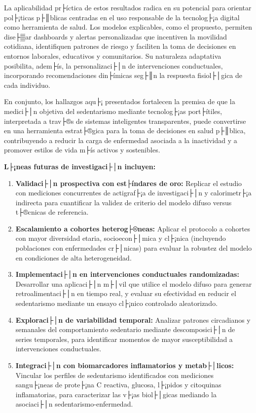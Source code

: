 La aplicabilidad pr├íctica de estos resultados radica en su potencial para orientar pol├¡ticas p├║blicas centradas en el uso responsable de la tecnolog├¡a digital como herramienta de salud. Los modelos explicables, como el propuesto, permiten dise├▒ar dashboards y alertas personalizadas que incentiven la movilidad cotidiana, identifiquen patrones de riesgo y faciliten la toma de decisiones en entornos laborales, educativos y comunitarios. Su naturaleza adaptativa posibilita, adem├ís, la personalizaci├│n de intervenciones conductuales, incorporando recomendaciones din├ímicas seg├║n la respuesta fisiol├│gica de cada individuo.

En conjunto, los hallazgos aqu├¡ presentados fortalecen la premisa de que la medici├│n objetiva del sedentarismo mediante tecnolog├¡as port├ítiles, interpretada a trav├®s de sistemas inteligentes transparentes, puede convertirse en una herramienta estrat├®gica para la toma de decisiones en salud p├║blica, contribuyendo a reducir la carga de enfermedad asociada a la inactividad y a promover estilos de vida m├ís activos y sostenibles.

\textbf{L├¡neas futuras de investigaci├│n incluyen:}

\begin{enumerate}
    \item \textbf{Validaci├│n prospectiva con est├índares de oro:} Replicar el estudio con mediciones concurrentes de actigraf├¡a de investigaci├│n y calorimetr├¡a indirecta para cuantificar la validez de criterio del modelo difuso versus t├®cnicas de referencia.
    
    \item \textbf{Escalamiento a cohortes heterog├®neas:} Aplicar el protocolo a cohortes con mayor diversidad etaria, socioecon├│mica y cl├¡nica (incluyendo poblaciones con enfermedades cr├│nicas) para evaluar la robustez del modelo en condiciones de alta heterogeneidad.
    
    \item \textbf{Implementaci├│n en intervenciones conductuales randomizadas:} Desarrollar una aplicaci├│n m├│vil que utilice el modelo difuso para generar retroalimentaci├│n en tiempo real, y evaluar su efectividad en reducir el sedentarismo mediante un ensayo cl├¡nico controlado aleatorizado.
    
    \item \textbf{Exploraci├│n de variabilidad temporal:} Analizar patrones circadianos y semanales del comportamiento sedentario mediante descomposici├│n de series temporales, para identificar momentos de mayor susceptibilidad a intervenciones conductuales.
    
    \item \textbf{Integraci├│n con biomarcadores inflamatorios y metab├│licos:} Vincular los perfiles de sedentarismo identificados con mediciones sangu├¡neas de prote├¡na C reactiva, glucosa, l├¡pidos y citoquinas inflamatorias, para caracterizar las v├¡as biol├│gicas mediando la asociaci├│n sedentarismo-enfermedad.
\end{enumerate}

